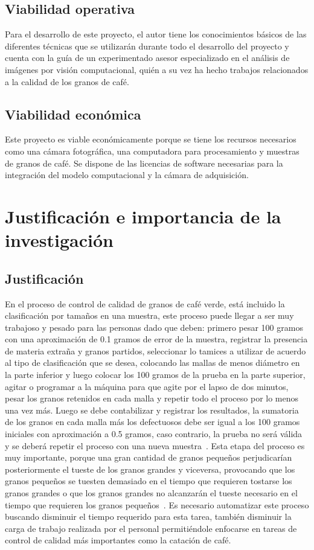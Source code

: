 \documentclass[12pt,a4paper,oneside]{book}
\begin{document}
\subsection{Viabilidad operativa}
Para el desarrollo de este proyecto, el autor tiene los conocimientos básicos de las diferentes técnicas que se utilizarán durante todo el desarrollo del proyecto y cuenta con la guía de un experimentado asesor especializado en el análisis de imágenes por visión computacional, quién a su vez ha hecho trabajos relacionados a la calidad de los granos de café.

\subsection{Viabilidad económica}
Este proyecto es viable económicamente porque se tiene los recursos necesarios como una cámara fotográfica, una computadora para procesamiento y muestras de granos de café.  Se dispone de las licencias de software necesarias para la integración del modelo computacional y la cámara de adquisición. 

\section{Justificación e importancia de la investigación}

\subsection{Justificación}
En el proceso de control de calidad de granos de café verde, está incluido la clasificación por tamaños en una muestra, este proceso puede llegar a ser muy trabajoso y pesado para las personas dado que deben: primero pesar 100 gramos con una aproximación de 0.1 gramos de error de la muestra, registrar la presencia de materia extraña y granos partidos, seleccionar lo tamices a utilizar de acuerdo al tipo de clasificación que se desea, colocando las mallas de menos diámetro en la parte inferior y luego colocar los 100 gramos de la prueba en la parte superior, agitar o programar a la máquina para que agite por el lapso de dos minutos, pesar los granos retenidos en cada malla y repetir todo el proceso por lo menos una vez más. Luego se debe contabilizar y registrar los resultados, la sumatoria de los granos en cada malla más los defectuosos debe ser igual a los 100 gramos iniciales con aproximación a 0.5 gramos, caso contrario, la prueba no será válida y se deberá repetir el proceso con una nueva muestra~\cite{Funez2010}. Esta etapa del proceso es muy importante, porque una gran cantidad de granos pequeños perjudicarían posteriormente el tueste de los granos grandes y viceversa, provocando que los granos pequeños se tuesten demasiado en el tiempo que requieren tostarse los granos grandes o que los granos grandes no alcanzarán el tueste necesario en el tiempo que requieren los granos pequeños~\cite{Hilten2011}. Es necesario automatizar este proceso buscando disminuir el tiempo requerido para esta tarea, también disminuir la carga de trabajo realizada por el personal permitiéndole enfocarse en tareas de control de calidad más importantes como la catación de café.
\end{document}
